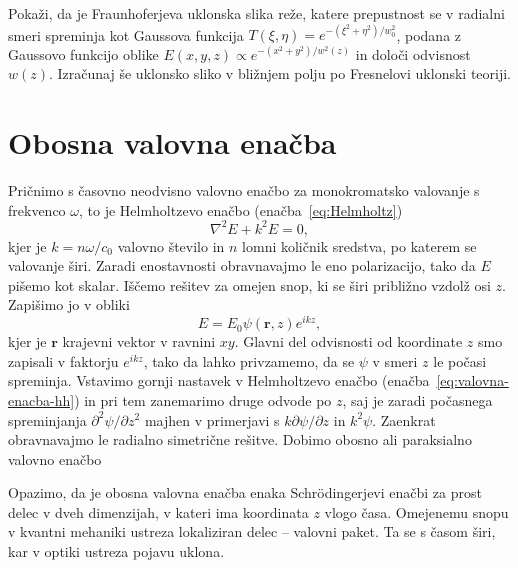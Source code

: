 \begin{definition}
Pokaži, da je Fraunhoferjeva uklonska slika reže, katere prepustnost se v radialni smeri
spreminja kot Gaussova funkcija $T(\xi, \eta)=e^{-(\xi^2+\eta^2)/w_0^2}$, podana z Gaussovo funkcijo
oblike $E(x,y,z) \propto e^{-(x^2+y^2)/w^2(z)}$ in določi odvisnost $w(z)$. Izračunaj še 
uklonsko sliko v bližnjem polju po Fresnelovi uklonski teoriji.
\end{definition}

\section{Obosna valovna enačba}
Pričnimo s časovno neodvisno valovno enačbo za monokromatsko valovanje
s frekvenco $\omega$, to je Helmholtzevo enačbo (enačba~\ref{eq:Helmholtz})
\begin{equation}
\nabla^{2}E+k^{2}E=0,
\label{eq:valovna-enacba-hh}
\end{equation}
kjer je $k=n\omega/c_{0}$ valovno število in $n$ lomni količnik
sredstva, po katerem se valovanje širi. Zaradi enostavnosti obravnavajmo
le eno polarizacijo, tako da $E$ pišemo kot skalar. Iščemo rešitev za
omejen snop, ki se širi približno vzdolž osi $z$. Zapišimo jo v obliki
\begin{equation}
E=E_{0}\psi(\mathbf{r},z)e^{ikz},
\label{eq:ravni-val-nastavek}
\end{equation}
kjer je $\mathbf{r}$ krajevni vektor v ravnini $xy$. Glavni del odvisnosti
od koordinate $z$ smo zapisali v faktorju $e^{ikz}$, tako da lahko
privzamemo, da se $\psi$ v smeri $z$ le počasi spreminja. Vstavimo
gornji nastavek v Helmholtzevo enačbo (enačba~\ref{eq:valovna-enacba-hh})
in pri tem zanemarimo druge odvode po $z$, saj je zaradi počasnega spreminjanja
$\partial^{2}\psi/\partial z^{2}$ majhen v primerjavi s $k\partial\psi/\partial z$ in $k^{2}\psi$.
Zaenkrat obravnavajmo le radialno simetrične rešitve. Dobimo obosno
ali paraksialno valovno enačbo
\begin{remark} 
Opazimo, da je obosna valovna enačba enaka Schr\"{o}dingerjevi enačbi
za prost delec v dveh dimenzijah, v kateri ima koordinata $z$ vlogo
časa. Omejenemu snopu v kvantni mehaniki ustreza lokaliziran delec
-- valovni paket. Ta se s časom širi, kar v optiki ustreza pojavu uklona.
\end{remark}
